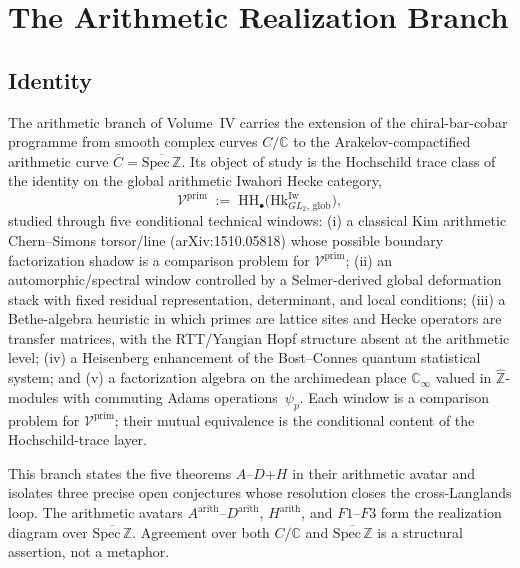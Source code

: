 \chapter{The Arithmetic Realization Branch}
\label{v4-arith:manifesto}

\section{Identity}
\label{v4-arith:manifesto:identity}

The arithmetic branch of Volume~IV carries the extension of the
chiral-bar-cobar programme from smooth complex curves
\(C/\mathbb{C}\) to the Arakelov-compactified arithmetic curve
\(\overline{C} = \overline{\mathrm{Spec}\,\mathbb{Z}}\). Its object of
study is the Hochschild trace class of the identity on the global
arithmetic Iwahori Hecke category,
\begin{equation}
\label{v4-arith:00:def:Vprim}
\mathcal{V}^{\mathrm{prim}}
\;:=\;
\mathrm{HH}_{\bullet}\bigl(\mathrm{Hk}^{\mathrm{Iw}}_{GL_{2},\,\mathrm{glob}}\bigr),
\end{equation}
studied through five conditional technical windows: (i) a classical
Kim arithmetic Chern--Simons torsor/line (arXiv:1510.05818) whose
possible boundary factorization shadow is a comparison problem for
\(\mathcal{V}^{\mathrm{prim}}\); (ii) an automorphic/spectral window
controlled by a Selmer-derived global deformation stack with fixed
residual representation, determinant, and local conditions; (iii) a
Bethe-algebra heuristic in which primes are lattice sites and Hecke
operators are transfer matrices, with the RTT/Yangian Hopf structure
absent at the arithmetic level; (iv) a Heisenberg enhancement of the
Bost--Connes quantum statistical system; and (v) a factorization
algebra on the archimedean place \(\mathbb{C}_{\infty}\) valued in
\(\widehat{\mathbb{Z}}\)-modules with commuting Adams
operations~\(\psi_{p}\). Each window is a comparison problem for
\(\mathcal{V}^{\mathrm{prim}}\); their mutual equivalence is
the conditional content of the Hochschild-trace layer.

This branch states the five theorems \(A\)--\(D\)+\(H\) in their
arithmetic avatar and isolates three precise open conjectures whose
resolution closes the cross-Langlands loop. The arithmetic avatars
\(A^{\mathrm{arith}}\)--\(D^{\mathrm{arith}}\),
\(H^{\mathrm{arith}}\), and \(F1\)--\(F3\) form the realization diagram
over \(\overline{\mathrm{Spec}\,\mathbb{Z}}\). Agreement over both
\(C/\mathbb{C}\) and \(\overline{\mathrm{Spec}\,\mathbb{Z}}\) is a
structural assertion, not a metaphor.

